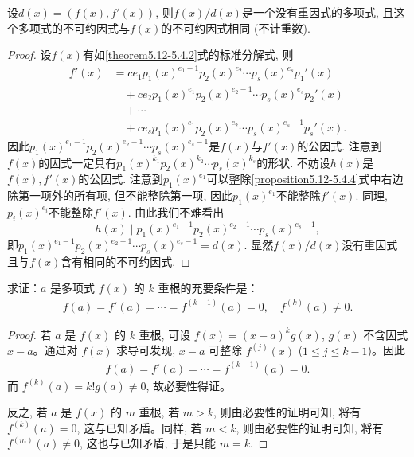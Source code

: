 \documentclass[../../main.tex]{subfiles}%
\begin{document}
\begin{theorem}\label{theorem:多项式除去与其导数的最大公因式就能消去重因式}
设\(d(x)=(f(x),f'(x))\), 则\(f(x)/d(x)\)是一个没有重因式的多项式, 且这个多项式的不可约因式与\(f(x)\)的不可约因式相同 (不计重数).
\end{theorem}
\begin{proof}

设\(f(x)\)有如\eqref{theorem5.12-5.4.2}式的标准分解式, 则
\begin{align}
f'(x)&=ce_1p_1(x)^{e_1 - 1}p_2(x)^{e_2}\cdots p_s(x)^{e_s}p_1'(x) \nonumber \\
&\quad +ce_2p_1(x)^{e_1}p_2(x)^{e_2 - 1}\cdots p_s(x)^{e_s}p_2'(x) \nonumber \\
&\quad +\cdots \nonumber \\
&\quad +ce_sp_1(x)^{e_1}p_2(x)^{e_2}\cdots p_s(x)^{e_s - 1}p_s'(x).\label{proposition5.12-5.4.4}
\end{align}
因此\(p_1(x)^{e_1 - 1}p_2(x)^{e_2 - 1}\cdots p_s(x)^{e_s - 1}\)是\(f(x)\)与\(f'(x)\)的公因式. 注意到\(f(x)\)的因式一定具有\(p_1(x)^{k_1}p_2(x)^{k_2}\cdots p_s(x)^{k_s}\)的形状. 不妨设\(h(x)\)是\(f(x),f'(x)\)的公因式. 注意到\(p_1(x)^{e_1}\)可以整除\eqref{proposition5.12-5.4.4}式中右边除第一项外的所有项, 但不能整除第一项, 因此\(p_1(x)^{e_1}\)不能整除\(f'(x)\). 同理, \(p_i(x)^{e_i}\)不能整除\(f'(x)\). 由此我们不难看出
\[
h(x)\mid p_1(x)^{e_1 - 1}p_2(x)^{e_2 - 1}\cdots p_s(x)^{e_s - 1},
\]
即\(p_1(x)^{e_1 - 1}p_2(x)^{e_2 - 1}\cdots p_s(x)^{e_s - 1}=d(x)\). 显然\(f(x)/d(x)\)没有重因式且与\(f(x)\)含有相同的不可约因式.

\end{proof}

\begin{proposition}[多项式有k重根的充要条件]\label{proposition:多项式有k重根的充要条件}
求证：$a$ 是多项式 $f(x)$ 的 $k$ 重根的充要条件是：
\begin{align*}
f(a) = f'(a) = \cdots = f^{(k-1)}(a) = 0, \quad f^{(k)}(a) \neq 0.
\end{align*}
\end{proposition}
\begin{proof}

若 $a$ 是 $f(x)$ 的 $k$ 重根, 可设 $f(x) = (x - a)^k g(x)$, $g(x)$ 不含因式 $x - a$。通过对 $f(x)$ 求导可发现, $x - a$ 可整除 $f^{(j)}(x)$ ($1 \leqslant  j \leqslant  k - 1$)。因此
\begin{align*}
f(a) = f'(a) = \cdots = f^{(k-1)}(a) = 0.
\end{align*}
而 $f^{(k)}(a) = k! g(a) \neq 0$, 故必要性得证。

反之, 若 $a$ 是 $f(x)$ 的 $m$ 重根, 若 $m > k$, 则由必要性的证明可知, 将有 $f^{(k)}(a) = 0$, 这与已知矛盾。同样, 若 $m < k$, 则由必要性的证明可知, 将有 $f^{(m)}(a) \neq 0$, 这也与已知矛盾, 于是只能 $m = k$.

\end{proof}
\end{document}
